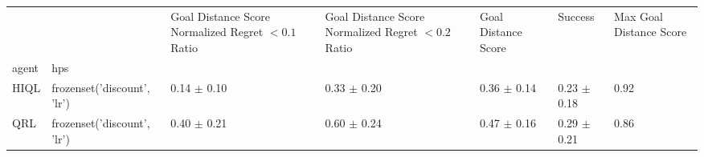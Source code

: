 \begin{tabular}{lllllll}
\toprule
 &  & Goal Distance Score Normalized Regret $< 0.1$ Ratio & Goal Distance Score Normalized Regret $< 0.2$ Ratio & Goal Distance Score & Success & Max Goal Distance Score \\
agent & hps &  &  &  &  &  \\
\midrule
HIQL & frozenset({'discount', 'lr'}) & 0.14 $\pm$ 0.10 & 0.33 $\pm$ 0.20 & 0.36 $\pm$ 0.14 & 0.23 $\pm$ 0.18 & 0.92 \\
\cline{1-7}
QRL & frozenset({'discount', 'lr'}) & 0.40 $\pm$ 0.21 & 0.60 $\pm$ 0.24 & 0.47 $\pm$ 0.16 & 0.29 $\pm$ 0.21 & 0.86 \\
\cline{1-7}
\bottomrule
\end{tabular}

